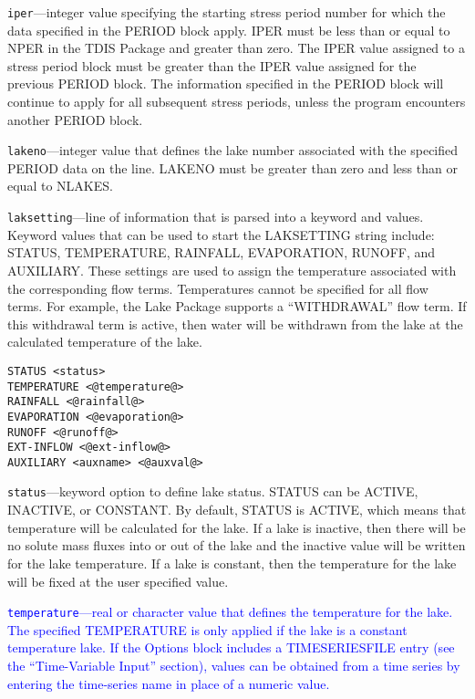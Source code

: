 \begin{description}
\item \texttt{iper}---integer value specifying the starting stress period number for which the data specified in the PERIOD block apply.  IPER must be less than or equal to NPER in the TDIS Package and greater than zero.  The IPER value assigned to a stress period block must be greater than the IPER value assigned for the previous PERIOD block.  The information specified in the PERIOD block will continue to apply for all subsequent stress periods, unless the program encounters another PERIOD block.

\item \texttt{lakeno}---integer value that defines the lake number associated with the specified PERIOD data on the line. LAKENO must be greater than zero and less than or equal to NLAKES.

\item \texttt{laksetting}---line of information that is parsed into a keyword and values.  Keyword values that can be used to start the LAKSETTING string include: STATUS, TEMPERATURE, RAINFALL, EVAPORATION, RUNOFF, and AUXILIARY.  These settings are used to assign the temperature associated with the corresponding flow terms.  Temperatures cannot be specified for all flow terms.  For example, the Lake Package supports a ``WITHDRAWAL'' flow term.  If this withdrawal term is active, then water will be withdrawn from the lake at the calculated temperature of the lake.

\begin{lstlisting}[style=blockdefinition]
STATUS <status>
TEMPERATURE <@temperature@>
RAINFALL <@rainfall@>
EVAPORATION <@evaporation@>
RUNOFF <@runoff@>
EXT-INFLOW <@ext-inflow@>
AUXILIARY <auxname> <@auxval@> 
\end{lstlisting}

\item \texttt{status}---keyword option to define lake status.  STATUS can be ACTIVE, INACTIVE, or CONSTANT. By default, STATUS is ACTIVE, which means that temperature will be calculated for the lake.  If a lake is inactive, then there will be no solute mass fluxes into or out of the lake and the inactive value will be written for the lake temperature.  If a lake is constant, then the temperature for the lake will be fixed at the user specified value.

\item \textcolor{blue}{\texttt{temperature}---real or character value that defines the temperature for the lake. The specified TEMPERATURE is only applied if the lake is a constant temperature lake. If the Options block includes a TIMESERIESFILE entry (see the ``Time-Variable Input'' section), values can be obtained from a time series by entering the time-series name in place of a numeric value.}


\end{description}
